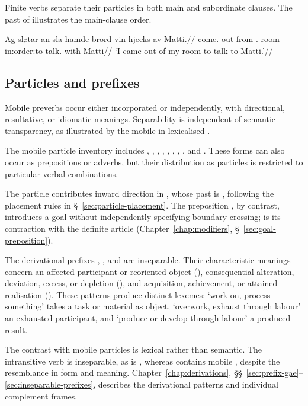 Finite verbs separate their particles in both main and subordinate clauses. The past of  illustrates the main-clause order.

\pex
\begingl
\gla Ag sløtar an sla hamde brord vin hjecks av Matti.//
\glb \First{}\Sg{} come.\Pst{} out from \Refl{}.\Nt{} room in:order:to talk.\Inf{} with Matti//
\glft `I came out of my room to talk to Matti.'//
\endgl
\xe

\subsection{Particles and prefixes}

Mobile preverbs occur either incorporated or independently, with directional, resultative, or idiomatic meanings. Separability is independent of semantic transparency, as illustrated by the mobile  in lexicalised .

The mobile particle inventory includes , , , , , , , , and . These forms can also occur as prepositions or adverbs, but their distribution as particles is restricted to particular verbal combinations.

The particle  contributes inward direction in , whose past is , following the placement rules in \S~\ref{sec:particle-placement}. The preposition , by contrast, introduces a goal without independently specifying boundary crossing;  is its contraction with the definite article (Chapter~\ref{chap:modifiers}, \S~\ref{sec:goal-preposition}).

The derivational prefixes , , and  are inseparable. Their characteristic meanings concern an affected participant or reoriented object (), consequen\-tial alteration, deviation, excess, or depletion (), and acquisition, achievement, or attained realisation (). These patterns produce distinct lexemes:  `work on, process something' takes a task or material as object,  `overwork, exhaust through labour' an exhausted participant, and  `produce or develop through labour' a produced result.

The contrast with mobile particles is lexical rather than semantic. The intransitive verb  is inseparable, as is , whereas  contains mobile , despite the resemblance in form and meaning. Chapter~\ref{chap:derivations}, \S\S~\ref{sec:prefix-gae}--\ref{sec:inseparable-prefixes}, describes the derivational patterns and individual complement frames.

